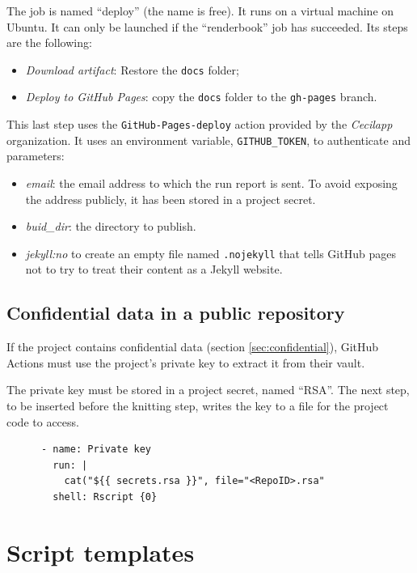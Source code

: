 \documentclass[
  12pt,
  american,
  a4paper,
  extrafontsizes,onecolumn,openright
  ]{memoir}
\providecommand{\tightlist}{%
  \setlength{\itemsep}{0pt}\setlength{\parskip}{0pt}}
\begin{document}
The job is named \enquote{deploy} (the name is free).
It runs on a virtual machine on Ubuntu.
It can only be launched if the \enquote{renderbook} job has succeeded.
Its steps are the following:

\begin{itemize}
\tightlist
\item
  \emph{Download artifact}: Restore the \texttt{docs} folder;
\item
  \emph{Deploy to GitHub Pages}: copy the \texttt{docs} folder to the \texttt{gh-pages} branch.
\end{itemize}

This last step uses the \texttt{GitHub-Pages-deploy} action provided by the \emph{Cecilapp} organization.
It uses an environment variable, \texttt{GITHUB\_TOKEN}, to authenticate and parameters:

\begin{itemize}
\tightlist
\item
  \emph{email}: the email address to which the run report is sent.
  To avoid exposing the address publicly, it has been stored in a project secret.
\item
  \emph{buid\_dir}: the directory to publish.
\item
  \emph{jekyll:no} to create an empty file named \texttt{.nojekyll} that tells GitHub pages not to try to treat their content as a Jekyll website.
\end{itemize}

\subsection{Confidential data in a public repository}\label{sec:confidentielCI}

If the project contains confidential data (section \ref{sec:confidential}), GitHub Actions must use the project's private key to extract it from their vault.

The private key must be stored in a project secret, named \enquote{RSA}.
The next step, to be inserted before the knitting step, writes the key to a file for the project code to access.

\begin{verbatim}
      - name: Private key
        run: |
          cat("${{ secrets.rsa }}", file="<RepoID>.rsa"
        shell: Rscript {0}
\end{verbatim}

\section{Script templates}\label{script-templates}
\end{document}
